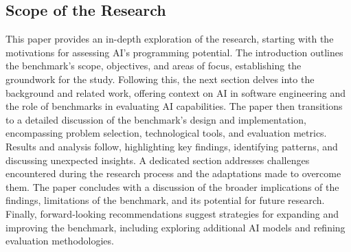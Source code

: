 \subsection{Scope of the Research}
This paper provides an in-depth exploration of the research, starting with the motivations for assessing AI's programming potential. The introduction outlines the benchmark's scope, objectives, and areas of focus, establishing the groundwork for the study. Following this, the next section delves into the background and related work, offering context on AI in software engineering and the role of benchmarks in evaluating AI capabilities. The paper then transitions to a detailed discussion of the benchmark’s design and implementation, encompassing problem selection, technological tools, and evaluation metrics. Results and analysis follow, highlighting key findings, identifying patterns, and discussing unexpected insights. A dedicated section addresses challenges encountered during the research process and the adaptations made to overcome them. The paper concludes with a discussion of the broader implications of the findings, limitations of the benchmark, and its potential for future research. Finally, forward-looking recommendations suggest strategies for expanding and improving the benchmark, including exploring additional AI models and refining evaluation methodologies.